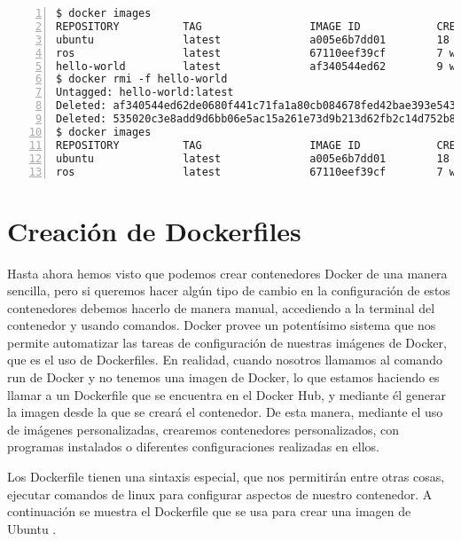	\begin{lstlisting}[style=consola,numbers=left]
$ docker images
REPOSITORY          TAG                 IMAGE ID            CREATED             VIRTUAL SIZE
ubuntu              latest              a005e6b7dd01        18 hours ago        188.4 MB
ros                 latest              67110eef39cf        7 weeks ago         826.7 MB
hello-world         latest              af340544ed62        9 weeks ago         960 B
$ docker rmi -f hello-world
Untagged: hello-world:latest
Deleted: af340544ed62de0680f441c71fa1a80cb084678fed42bae393e543faea3a572c
Deleted: 535020c3e8add9d6bb06e5ac15a261e73d9b213d62fb2c14d752b8e189b2b912
$ docker images
REPOSITORY          TAG                 IMAGE ID            CREATED             VIRTUAL SIZE
ubuntu              latest              a005e6b7dd01        18 hours ago        188.4 MB
ros                 latest              67110eef39cf        7 weeks ago         826.7 MB
	\end{lstlisting}
	
	\section{Creación de Dockerfiles}
	Hasta ahora hemos visto que podemos crear contenedores Docker de una manera sencilla, pero si queremos hacer algún tipo de cambio en la configuración de estos contenedores debemos hacerlo de manera manual, accediendo a la terminal del contenedor y usando comandos. Docker provee un potentísimo sistema que nos permite automatizar las tareas de configuración de nuestras imágenes de Docker, que es el uso de Dockerfiles. En realidad, cuando nosotros llamamos al comando run de Docker y no tenemos una imagen de Docker, lo que estamos haciendo es llamar a un Dockerfile que se encuentra en el Docker Hub, y mediante él generar la imagen desde la que se creará el contenedor. De esta manera, mediante el uso de imágenes personalizadas, crearemos contenedores personalizados, con programas instalados o diferentes configuraciones realizadas en ellos.
	
	Los Dockerfile tienen una sintaxis especial, que nos permitirán entre otras cosas, ejecutar comandos de linux para configurar aspectos de nuestro contenedor. A continuación se muestra el Dockerfile que se usa para crear una imagen de Ubuntu \cite{ubuntu-dockerfile}.
	
